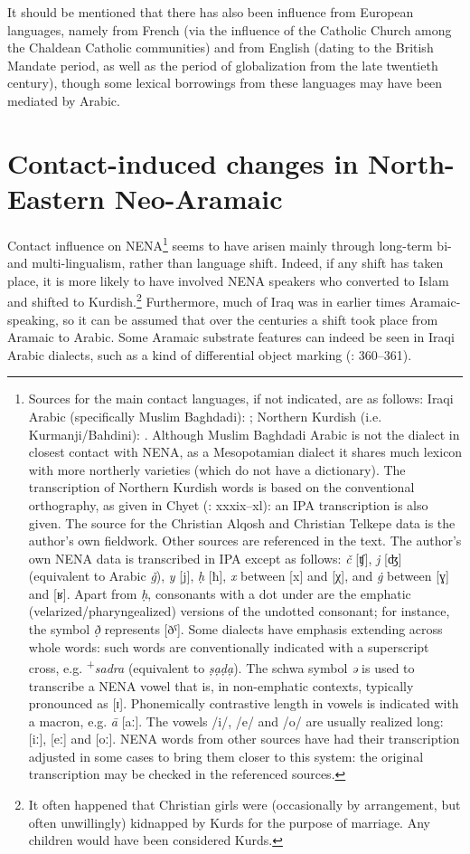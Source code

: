 \documentclass[output=paper]{langsci/langscibook}
\begin{document}
It should be mentioned that there has also been influence from European languages, namely from French (via the influence of the Catholic Church among the Chaldean Catholic communities) and from English (dating to the British Mandate period, as well as the period of globalization from the late twentieth century), though some lexical borrowings from these languages may have been mediated by Arabic.


\section{Contact-induced changes in North-Eastern Neo-Aramaic}

Contact influence on NENA\footnote{Sources for the main contact languages, if not indicated, are as follows: Iraqi Arabic (specifically Muslim Baghdadi): \citet{WoodheadEtAl1967}; Northern Kurdish (i.e. Kurmanji/Bahdini): \citet{Chyet2003}. Although Muslim Baghdadi Arabic is not the dialect in closest contact with NENA, as a Mesopotamian dialect it shares much lexicon with more northerly varieties (which do not have a dictionary). The transcription of Northern Kurdish words is based on the conventional orthography, as given in Chyet (\citeyear{Chyet2003}: xxxix–xl): an IPA transcription is also given. The source for the Christian Alqosh and Christian Telkepe data is the author’s own fieldwork. Other sources are referenced in the text. The author’s own NENA data is transcribed in IPA except as follows: \textit{č} [ʧ], \textit{j} [ʤ] (equivalent to Arabic \textit{ǧ}), \textit{y} [j], \textit{ḥ} [ħ], \textit{x} between [x] and [χ], and \textit{\.g} between [ɣ] and [ʁ]. Apart from \textit{ḥ}, consonants with a dot under are the emphatic (velarized/pharyngealized) versions of the undotted consonant; for instance, the symbol \textit{ð̣} represents [ðˤ]. Some dialects have emphasis extending across whole words: such words are conventionally indicated with a superscript cross, e.g. \textrm{\textsuperscript{+}}\textrm{\textit{sadra} }\textrm{(equivalent to} \textrm{\textit{ṣạḍ{\R}ạ}}). The schwa symbol \textit{ə} is used to transcribe a NENA vowel that is, in non-emphatic contexts, typically pronounced as [ɪ]. Phonemically contrastive length in vowels is indicated with a macron, e.g. \textit{ā} [aː]. The vowels /i/, /e/ and /o/ are usually realized long: [iː], [eː] and [oː]. NENA words from other sources have had their transcription adjusted in some cases to bring them closer to this system: the original transcription may be checked in the referenced sources.} seems to have arisen mainly through long-term bi- and multi-lingualism, rather than language shift. Indeed, if any shift has taken place, it is more likely to have involved NENA speakers who converted to Islam and shifted to Kurdish.\footnote{It often happened that Christian girls were (occasionally by arrangement, but often unwillingly) kidnapped by Kurds for the purpose of marriage. Any children would have been considered Kurds.} Furthermore, much of Iraq was in earlier times Aramaic-speaking, so it can be assumed that over the centuries a shift took place from Aramaic to Arabic. Some Aramaic substrate features can indeed be seen in Iraqi Arabic dialects, such as a kind of differential object marking (\citealt{Coghill2014}: 360–361).
\end{document}
